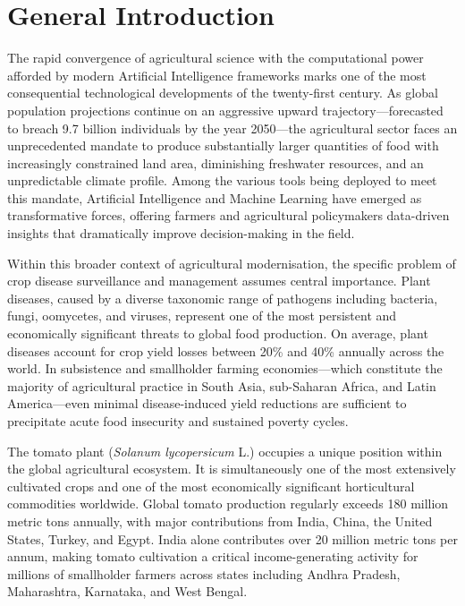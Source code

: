 \documentclass[12pt,a4paper]{report}
\begin{document}
\section{General Introduction}

The rapid convergence of agricultural science with the computational power afforded by modern Artificial Intelligence frameworks marks one of the most consequential technological developments of the twenty-first century. As global population projections continue on an aggressive upward trajectory---forecasted to breach 9.7 billion individuals by the year 2050---the agricultural sector faces an unprecedented mandate to produce substantially larger quantities of food with increasingly constrained land area, diminishing freshwater resources, and an unpredictable climate profile. Among the various tools being deployed to meet this mandate, Artificial Intelligence and Machine Learning have emerged as transformative forces, offering farmers and agricultural policymakers data-driven insights that dramatically improve decision-making in the field.

Within this broader context of agricultural modernisation, the specific problem of crop disease surveillance and management assumes central importance. Plant diseases, caused by a diverse taxonomic range of pathogens including bacteria, fungi, oomycetes, and viruses, represent one of the most persistent and economically significant threats to global food production. On average, plant diseases account for crop yield losses between 20\% and 40\% annually across the world. In subsistence and smallholder farming economies---which constitute the majority of agricultural practice in South Asia, sub-Saharan Africa, and Latin America---even minimal disease-induced yield reductions are sufficient to precipitate acute food insecurity and sustained poverty cycles.

The tomato plant (\textit{Solanum lycopersicum} L.) occupies a unique position within the global agricultural ecosystem. It is simultaneously one of the most extensively cultivated crops and one of the most economically significant horticultural commodities worldwide. Global tomato production regularly exceeds 180 million metric tons annually, with major contributions from India, China, the United States, Turkey, and Egypt. India alone contributes over 20 million metric tons per annum, making tomato cultivation a critical income-generating activity for millions of smallholder farmers across states including Andhra Pradesh, Maharashtra, Karnataka, and West Bengal.
\end{document}

